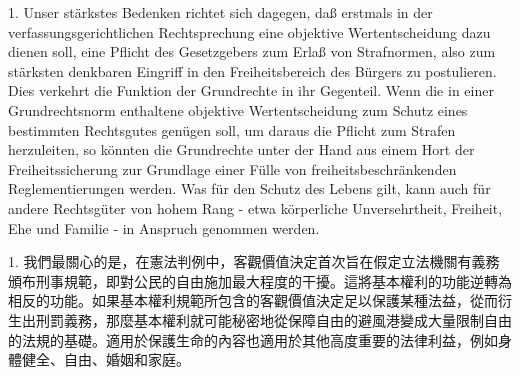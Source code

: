 \documentclass[12pt]{article}
\begin{document}
\syncleft
\begin{sourcepara}
1. Unser stärkstes Bedenken richtet sich dagegen, daß erstmals in der verfassungsgerichtlichen Rechtsprechung eine objektive Wertentscheidung dazu dienen soll, eine Pflicht des Gesetzgebers zum Erlaß von Strafnormen, also zum stärksten denkbaren Eingriff in den Freiheitsbereich des Bürgers zu postulieren. Dies verkehrt die Funktion der Grundrechte in ihr Gegenteil. Wenn die in einer Grundrechtsnorm enthaltene objektive Wertentscheidung zum Schutz eines bestimmten Rechtsgutes genügen soll, um daraus die Pflicht zum Strafen herzuleiten, so könnten die Grundrechte unter der Hand aus einem Hort der Freiheitssicherung zur Grundlage einer Fülle von freiheitsbeschränkenden Reglementierungen werden. Was für den Schutz des Lebens gilt, kann auch für andere Rechtsgüter von hohem Rang - etwa körperliche Unversehrtheit, Freiheit, Ehe und Familie - in Anspruch genommen werden.
\end{sourcepara}
\begin{transpara}
1. 我們最關心的是，在憲法判例中，客觀價值決定首次旨在假定立法機關有義務頒布刑事規範，即對公民的自由施加最大程度的干擾。這將基本權利的功能逆轉為相反的功能。如果基本權利規範所包含的客觀價值決定足以保護某種法益，從而衍生出刑罰義務，那麼基本權利就可能秘密地從保障自由的避風港變成大量限制自由的法規的基礎。適用於保護生命的內容也適用於其他高度重要的法律利益，例如身體健全、自由、婚姻和家庭。
\end{transpara}
\end{document}
